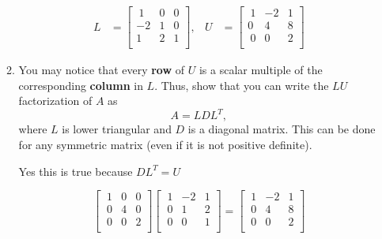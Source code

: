 \documentclass{article}
\begin{document}
\begin{enumerate}
\begin{enumerate}
\begin{mdframed}[style=MyFrame]
\begin{align*}
L &= \begin{bmatrix}
 ~1     &0     &0 \\
    -2     &1     &0 \\
     1     &2     &1 \\
\end{bmatrix},
&U &= \begin{bmatrix}
 ~1     &-2     &1 \\
    0     &4     &8 \\
     ~0     &0     &2 \\
\end{bmatrix}
\end{align*}

\end{mdframed}

\item You may notice that every {\bf row} of $U$ is a scalar multiple of the corresponding {\bf column} in $L$. Thus, show that you can write the $LU$ factorization of $A$ as
\begin{equation*}
A = L D L^T,
\end{equation*}
where $L$ is lower triangular and $D$ is a diagonal matrix. This can be done for any symmetric matrix (even if it is not positive definite). \newline

\begin{mdframed}[style=MyFrame]

Yes this is true because $DL^T = U$

\begin{equation*}
\begin{bmatrix}
 ~1     &0     &0 \\
    ~0     &4     &0 \\
     ~0     &0     &2 \\
\end{bmatrix}
\begin{bmatrix}
 ~1     &-2     &1 \\
    ~0     &1    &2 \\
     ~0     &0     &1 \\
\end{bmatrix}
=
\begin{bmatrix}
 ~1     &-2     &1 \\
    ~0     &4     &8 \\
     ~0     &0     &2 \\
\end{bmatrix}
\end{equation*}


\end{mdframed}
\end{enumerate}
\end{enumerate}
\end{document}
